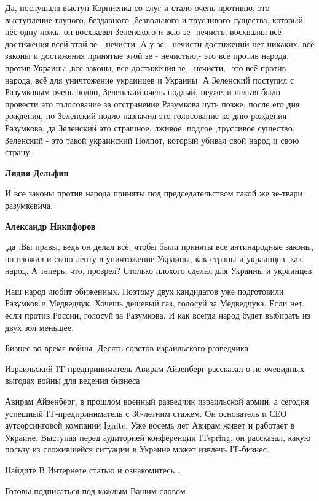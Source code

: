 \begin{itemize}

Да, послушала выступ Корниенка со слуг и стало очень противно, это выступление
глупого, бездарного ,безвольного и трусливого существа, который нёс одну ложь, он
восхвалял Зеленского и всю зе- нечисть, восхвалял всё достижения всей этой зе -
нечисти. А у зе - нечисти достижений нет никаких, всё законы и достижения
принятые этой зе - нечистью,- это всё против народа, против Украины ,все
законы, все достижения зе - нечисти,- это всё против народа, всё для уничтожение
украинцев и Украины. А Зеленский поступил с Разумковым очень подло, Зеленский
очень подлый, неужели нельзя было провести это голосование за отстранение
Разумкова чуть позже, после его дня рождения, но Зеленский подло назначил это
голосование ко дню рождения Разумкова, да Зеленский это страшное, лживое, подлое
,трусливое существо, Зеленский - это такой украинский Полпот, который убивал свой
народ и свою страну.

\begin{itemize} %
\textbf{Лидия Дельфин} 

И все законы против народа приняты под председательством такой же зе-твари
разумкевича.

\textbf{Александр Никифоров} 

,да ,Вы правы, ведь он делал всё, чтобы были приняты все антинародные законы,
он вложил и свою лепту в уничтожение Украины, как страны и украинцев, как
народ. А теперь, что, прозрел? Столько плохого сделал для Украины и украинцев.

\end{itemize} %


Наш народ любит обиженных. Поэтому двух кандидатов уже подготовили. Разумков и
Медведчук. Хочешь дешевый газ, голосуй за Медведчука. Если нет, если против
России, голосуй за Разумкова. И как всегда народ будет выбирать из двух зол
меньшее.


Бизнес во время войны. Десять советов израильского разведчика

Израильский IT-предприниматель Авирам Айзенберг рассказал о не очевидных
выгодах войны для ведения бизнеса

Авирам Айзенберг, в прошлом военный разведчик израильской армии, а сегодня
успешный IT-предприниматель с 30-летним стажем. Он основатель и СЕО
аутсорсинговой компании Ignite. Уже восемь лет Авирам живет и работает в
Украине. Выступая перед аудиторией конференции ITspring, он рассказал, какую
пользу из сложившейся ситуации в Украине может извлечь IT-бизнес.

Найдите В Интернете статью и ознакомитесь .

Готовы подписаться под каждым Вашим словом

\end{itemize} %
